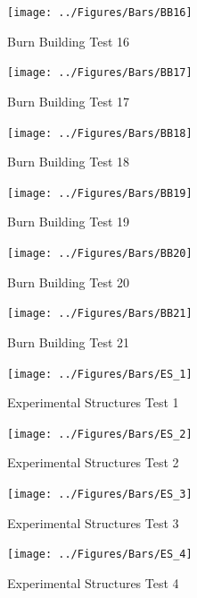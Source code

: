 \documentclass[12pt,oneside]{book}
\begin{document}
\begin{figure}[!ht]
	\texttt{[image: ../Figures/Bars/BB16]}
	\caption{Burn Building Test 16}
	\label{fig:Burn_Building_Test_16}
\end{figure}

\clearpage

\begin{figure}[!ht]
	\texttt{[image: ../Figures/Bars/BB17]}
	\caption{Burn Building Test 17}
	\label{fig:Burn_Building_Test_17}
\end{figure}

\begin{figure}[!ht]
	\texttt{[image: ../Figures/Bars/BB18]}
	\caption{Burn Building Test 18}
	\label{fig:Burn_Building_Test_18}
\end{figure}

\begin{figure}[!ht]
	\texttt{[image: ../Figures/Bars/BB19]}
	\caption{Burn Building Test 19}
	\label{fig:Burn_Building_Test_19}
\end{figure}

\begin{figure}[!ht]
	\texttt{[image: ../Figures/Bars/BB20]}
	\caption{Burn Building Test 20}
	\label{fig:Burn_Building_Test_20}
\end{figure}

\begin{figure}[!ht]
	\texttt{[image: ../Figures/Bars/BB21]}
	\caption{Burn Building Test 21}
	\label{fig:Burn_Building_Test_21}
\end{figure}

\clearpage

\begin{figure}[!ht]
	\texttt{[image: ../Figures/Bars/ES\_1]}
	\caption{Experimental Structures Test 1}
	\label{fig:Experimental_Structures_Test_1}
\end{figure}

\begin{figure}[!ht]
	\texttt{[image: ../Figures/Bars/ES\_2]}
	\caption{Experimental Structures Test 2}
	\label{fig:Experimental_Structures_Test_2}
\end{figure}

\begin{figure}[!ht]
	\texttt{[image: ../Figures/Bars/ES\_3]}
	\caption{Experimental Structures Test 3}
	\label{fig:Experimental_Structures_Test_3}
\end{figure}

\begin{figure}[!ht]
	\texttt{[image: ../Figures/Bars/ES\_4]}
	\caption{Experimental Structures Test 4}
	\label{fig:Experimental_Structures_Test_4}
\end{figure}
\end{document}
